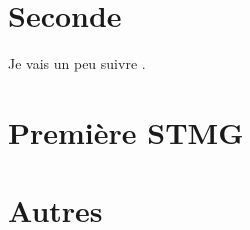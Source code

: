 



\makeindex
\makenomenclature







\tableofcontents

\newpage

\part{Seconde}

Je vais un peu suivre \cite{oklaEg}.



\part{Première STMG}


\part{Autres}








\printnomenclature

\printindex





